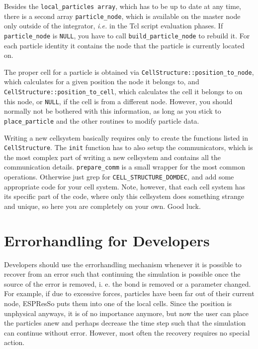 \documentclass[
a4paper,                        %
11pt,                           %
twoside,                        %
footsepline,                    %
headsepline,                    %
headexclude,                    %
footexclude,                    %
pagesize,                       %
bibtotocnumbered,               %
idxtotoc                        %
]{scrreprt}
\newcommand{\es}{\mbox{\textsf{ESPResSo}}\xspace}
\newcommand{\ie}{\textit{i.e.}\xspace}
\begin{document}
Besides the \verb!local_particles array!, which has to be up to date
at any time, there is a second array \verb!particle_node!, which is
available on the master node only outside of the integrator, \ie in
the Tcl script evaluation phases. If \verb!particle_node! is
\verb!NULL!, you have to call \verb!build_particle_node! to rebuild
it. For each particle identity it contains the node that the particle
is currently located on.
	
The proper cell for a particle is obtained via
\verb!CellStructure::position_to_node!, which calculates for a given
position the node it belongs to, and
\verb!CellStructure::position_to_cell!, which calculates the cell it
belongs to on this node, or \verb!NULL!, if the cell is from a
different node.  However, you should normally not be bothered with
this information, as long as you stick to \verb!place_particle! and
the other routines to modify particle data.

Writing a new cellsystem basically requires only to create the
functions listed in \verb!CellStructure!. The \verb!init! function has
to also setup the communicators, which is the most complex part of
writing a new cellsystem and contains all the communication
details. \verb!prepare_comm! is a small wrapper for the most common
operations. Otherwise just grep for \verb!CELL_STRUCTURE_DOMDEC!, and
add some appropriate code for your cell system. Note, however, that
each cell system has its specific part of the code, where only this
cellsystem does something strange and unique, so here you are
completely on your own. Good luck.

\section{Errorhandling for Developers}

Developers should use the errorhandling mechanism whenever it is
possible to recover from an error such that continuing the simulation
is possible once the source of the error is removed, i. e. the bond is
removed or a parameter changed. For example, if due to excessive
forces, particles have been far out of their current node, \es
puts them into one of the local cells. Since the position is
unphysical anyways, it is of no importance anymore, but now the user
can place the particles anew and perhaps decrease the time step such
that the simulation can continue without error. However, most often
the recovery requires no special action.
\end{document}
